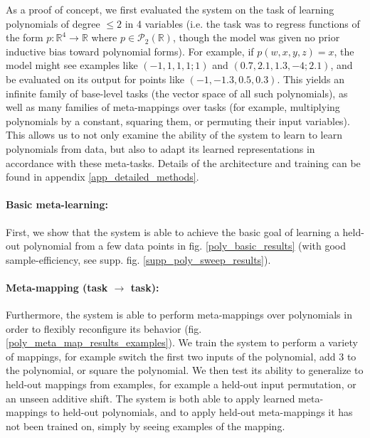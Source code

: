 \documentclass{article}
\begin{document}
As a proof of concept, we first evaluated the system on the task of learning polynomials of degree $\leq 2$ in 4 variables (i.e. the task was to regress functions of the form $p: \mathbb{R}^4 \rightarrow \mathbb{R}$ where $p \in \mathcal{P}_2 \left(\mathbb{R}\right)$, though the model was given no prior inductive bias toward polynomial forms). For example, if $p(w,x,y,z) = x$, the model might see examples like $(-1,1,1,1; 1)$ and $(0.7, 2.1, 1.3, -4; 2.1)$, and be evaluated on its output for points like $(-1, -1.3, 0.5, 0.3)$. This yields an infinite family of base-level tasks (the vector space of all such polynomials), as well as many families of meta-mappings over tasks (for example, multiplying polynomials by a constant, squaring them, or permuting their input variables). This allows us to not only examine the ability of the system to learn to learn polynomials from data, but also to adapt its learned representations in accordance with these meta-tasks. Details of the architecture and training can be found in appendix \ref{app_detailed_methods}.\par
\vspace{-0.7em}
\paragraph{Basic meta-learning:} First, we show that the system is able to achieve the basic goal of learning a held-out polynomial from a few data points in fig. \ref{poly_basic_results} (with good sample-efficiency, see supp. fig. \ref{supp_poly_sweep_results}). \par 
\vspace{-0.7em}
\paragraph{Meta-mapping (task $\rightarrow$ task):} Furthermore, the system is able to perform meta-mappings over polynomials in order to flexibly reconfigure its behavior (fig. \ref{poly_meta_map_results_examples}). We train the system to perform a variety of mappings, for example switch the first two inputs of the polynomial, add 3 to the polynomial, or square the polynomial. We then test its ability to generalize to held-out mappings from examples, for example a held-out input permutation, or an unseen additive shift. The system is both able to apply learned meta-mappings to held-out polynomials, and to apply held-out meta-mappings it has not been trained on, simply by seeing examples of the mapping. \par 
\end{document}

